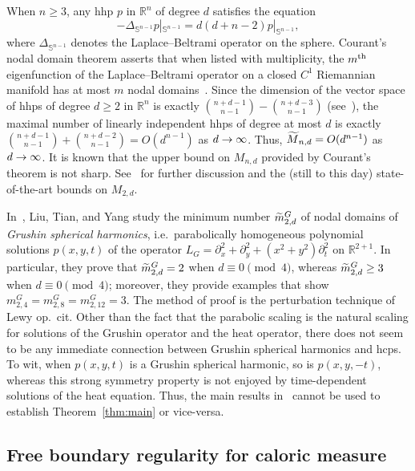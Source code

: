 \documentclass[10pt]{amsart}
\theoremstyle{definition}\newtheorem{defi}[theo]{Definition}\newtheorem{rema}[theo]{Remark}\newtheorem{exam}[theo]{Example}\newtheorem{exem}[theo]{Example}\newtheorem{nota}[theo]{Notation}
\newcommand{\R}{\mathbb{R}}
\newcommand{\sphere}{\mathbb{S}}
\let\oldtilde\tilde
\renewcommand*{\tilde}[1]{\mathchoice{\widetilde{#1}}{\widetilde{#1}}{\oldtilde{#1}}{\oldtilde{#1}}}
\renewcommand*{\to}{\mathchoice{\longrightarrow}{\rightarrow}{\rightarrow}{\rightarrow}}
\begin{document}
When $n\geq 3$, any hhp $p$ in $\R^n$ of degree $d$ satisfies the equation
\[
-\Delta_{\sphere^{n-1}} p|_{\sphere^{n-1}} = d(d+n-2)p|_{\sphere^{n-1}},
\]
where $\Delta_{\sphere^{n-1}}$ denotes the Laplace--Beltrami operator on the sphere. Courant's nodal domain theorem asserts that when listed with multiplicity, the $m^{\rm th}$ eigenfunction of the Laplace--Beltrami operator on a closed $C^1$ Riemannian manifold has at most $m$ nodal domains~\cite{CH,local-courant}. Since the dimension of the vector space of hhps of degree $d \ge 2$ in $\R^n$ is exactly $\binom{n+d-1}{n-1} - \binom{n+d-3}{n-1}$ (see~\cite[Proposition~5.8]{ABR}), the maximal number of linearly independent hhps of degree at most $d$ is exactly $\binom{n+d-1}{n-1} + \binom{n+d-2}{n-1}=O(d^{n-1})$ as $d\to\infty$. Thus, $\tilde M_{n,d}=O(d^{n-1})$ as $d\to\infty$. It is known that the upper bound on $M_{n,d}$ provided by Courant's theorem is not sharp. See~\cite{Leydold96} for further discussion and the (still to this day) state-of-the-art bounds on $M_{2,d}$.

In~\cite{LTY15}, Liu, Tian, and Yang study the minimum number $\tilde m^G_{2,d}$ of nodal domains of \emph{Grushin spherical harmonics}, i.e.~parabolically homogeneous polynomial solutions $p(x,y,t)$ of the operator $L_G=\partial_x^2 + \partial_y^2 + (x^2 + y^2) \partial_t^2$ on $\R^{2+1}$. In particular, they prove that $\tilde m^G_{2,d}=2$ when $d\equiv 0\pmod{4}$, whereas $\tilde m^G_{2,d}\geq 3$ when $d\equiv 0\pmod{4}$; moreover, they provide examples that show $m^G_{2,4}=m^G_{2,8}=m^G_{2,12}=3$. The method of proof is the perturbation technique of Lewy op.~cit. Other than the fact that the parabolic scaling is the natural scaling for solutions of the Grushin operator and the heat operator, there does not seem to be any immediate connection between Grushin spherical harmonics and hcps. To wit, when $p(x,y,t)$ is a Grushin spherical harmonic, so is $p(x,y,-t)$, whereas this strong symmetry property is not enjoyed by time-dependent solutions of the heat equation. Thus, the main results in~\cite{LTY15} cannot be used to establish Theorem~\ref{thm:main} or vice-versa.


\subsection{Free boundary regularity for caloric measure} \label{ss:2-phase}
\end{document}
